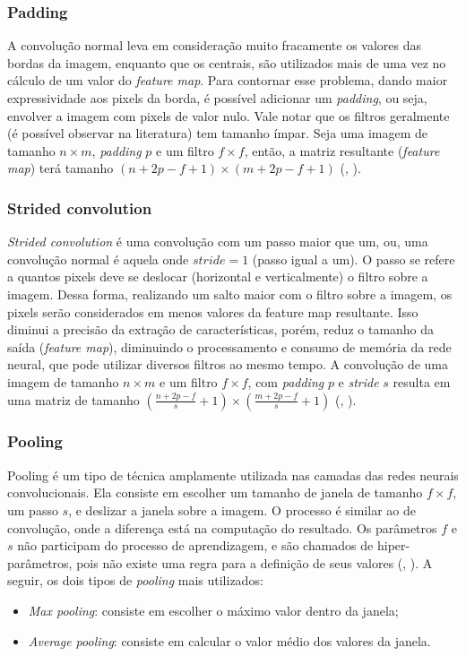 \documentclass[]{politex}
\begin{document}
\subsubsection{Padding}
A convolução normal leva em consideração muito fracamente os valores das bordas da imagem, enquanto que os centrais, são utilizados mais de uma vez no cálculo de um valor do \textit{feature map}. Para contornar esse problema, dando maior expressividade aos pixels da borda, é possível adicionar um \textit{padding}, ou seja, envolver a imagem com pixels de valor nulo. Vale notar que os filtros geralmente (é possível observar na literatura) tem tamanho ímpar. Seja uma imagem de tamanho \(n \times m\), \textit{padding} \(p\) e um filtro \(f \times f\), então, a matriz resultante (\textit{feature map}) terá tamanho \((n+2p-f+1) \times (m+2p-f+1)\) (, \citeyear{cnncourse}).

\subsubsection{Strided convolution}
\textit{Strided convolution} é uma convolução com um passo maior que um, ou, uma convolução normal é aquela onde \(stride=1\) (passo igual a um). O passo se refere a quantos pixels deve se deslocar (horizontal e verticalmente) o filtro sobre a imagem. Dessa forma, realizando um salto maior com o filtro sobre a imagem, os pixels serão considerados em menos valores da feature map resultante. Isso diminui a precisão da extração de características, porém, reduz o tamanho da saída (\textit{feature map}), diminuindo o processamento e consumo de memória da rede neural, que pode utilizar diversos filtros ao mesmo tempo. A convolução de uma imagem de tamanho \(n \times m\) e um filtro \(f \times f\), com \textit{padding} \(p\) e \textit{stride} \(s\) resulta em uma matriz de tamanho \((\frac{n+2p-f}{s}+1) \times (\frac{m+2p-f}{s}+1)\) (, \citeyear{cnncourse}).

\subsubsection{Pooling}
Pooling é um tipo de técnica amplamente utilizada nas camadas das redes neurais convolucionais. Ela consiste em escolher um tamanho de janela de tamanho \(f \times f\), um passo \(s\), e deslizar a janela sobre a imagem. O processo é similar ao de convolução, onde a diferença está na computação do resultado. Os parâmetros \(f\) e \(s\) não participam do processo de aprendizagem, e são chamados de hiper-parâmetros, pois não existe uma regra para a definição de seus valores (, \citeyear{cnncourse}). A seguir, os dois tipos de \textit{pooling} mais utilizados:
\begin{itemize}
\item \textit{Max pooling}: consiste em escolher o máximo valor dentro da janela;
\item \textit{Average pooling}: consiste em calcular o valor médio dos valores da janela.
\end{itemize}
\end{document}

